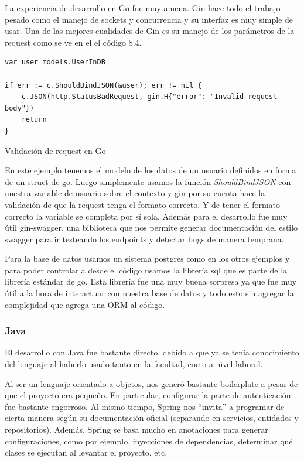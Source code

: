\documentclass[11pt]{article}
\let\Oldsubsubsection\subsubsection
\renewcommand{\subsubsection}{\FloatBarrier\Oldsubsubsection}
\begin{document}
La experiencia de desarrollo en Go fue muy amena. Gin hace todo el trabajo pesado como el manejo de sockets y concurrencia y su interfaz es muy simple de usar. Una de las mejores cualidades de Gin es su manejo de los parámetros de la request como se ve en el el código 8.4.

\begin{listing}
\begin{verbatim}
var user models.UserInDB

if err := c.ShouldBindJSON(&user); err != nil {
	c.JSON(http.StatusBadRequest, gin.H{"error": "Invalid request body"})
	return
}
\end{verbatim}
\caption{Validación de request en Go}
\label{code:http_go}
\end{listing}

En este ejemplo tenemos el modelo de los datos de un usuario definidos en forma de un struct de go. Luego simplemente usamos la función \textit{ShouldBindJSON} con nuestra variable de usuario sobre el contexto y gin por su cuenta hace la validación de que la request tenga el formato correcto. Y de tener el formato correcto la variable se completa por sí sola. Además para el desarrollo fue muy útil gin-swagger, una biblioteca que nos permite generar documentación del estilo swagger para ir testeando los endpoints y detectar bugs de manera temprana.

Para la base de datos usamos un sistema postgres como en los otros ejemplos y para poder controlarla desde el código usamos la librería sql que es parte de la librería estándar de go. Esta librería fue una muy buena sorpresa ya que fue muy útil a la hora de interactuar con nuestra base de datos y todo esto sin agregar la complejidad que agrega una ORM al código.


\subsubsection{Java}

El desarrollo con Java fue bastante directo, debido a que ya se tenía conocimiento del lenguaje al haberlo usado tanto en la facultad, como a nivel laboral. 

Al ser un lenguaje orientado a objetos, nos generó bastante boilerplate a pesar de que el proyecto era pequeño. En particular, configurar la parte de autenticación fue bastante engorroso. Al mismo tiempo, Spring nos “invita” a programar de cierta manera según su documentación oficial (separando en servicios, entidades y repositorios). Además, Spring se basa mucho en anotaciones para generar configuraciones, como por ejemplo, inyecciones de dependencias, determinar qué clases se ejecutan al levantar el proyecto, etc.
\end{document}
